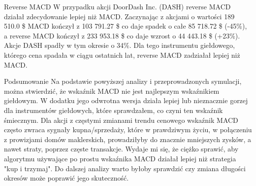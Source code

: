 \documentclass{article}
\begin{document}
\begin{section}{Reverse MACD}
    W przypadku akcji DoorDash Inc. (DASH) reverse MACD działał zdecydowanie lepiej niż MACD. Zaczynając z akcjami o wartości 189 510.0 \$
    MACD kończył z 103 791.27 \$ co daje spadek o całe 85 718.72 \$ (-45\%), a reverse MACD kończył z 233 953.18 \$ co daje wzrost o 44 443.18 \$ (+23\%). 
    Akcje DASH spadły w tym okresie o 34\%.
    Dla tego instrumentu giełdowego, którego cena spadała w ciągu ostatnich lat, reverse MACD zadziałał lepiej niż MACD.
\end{section}

\begin{section}{Podsumowanie}
    Na podstawie powyższej analizy i przeprowadzonych symulacji, można stwierdzić, że wskaźnik MACD nie jest najlepszym wskaźnikiem giełdowym.
    W dodatku jego odwrotna wersja działa lepiej lub nieznacznie gorzej dla instrumentów giełdowych, które sprawdzałem, co czyni ten wskaźnik śmiecznym.
    Dla akcji z częstymi zmianami trendu cenowego wskaźnik MACD często zwraca sygnały kupna/sprzedaży, które w prawdziwym życiu,
    w połączeniu z prowizjami domów maklerskich, prowadziłyby do znacznie mniejszych zysków, a nawet straty, poprzez częste transakcje. 
    Wydaje mi się, że ciężko sprawić, aby algorytmu używające po prostu wskaźnika MACD działał lepiej niż strategia "kup i trzymaj".
    Do dalszej analizy warto byłoby sprawdzić czy zmiana długości okresów może poprawić jego skuteczność.
\end{section}
\end{document}
